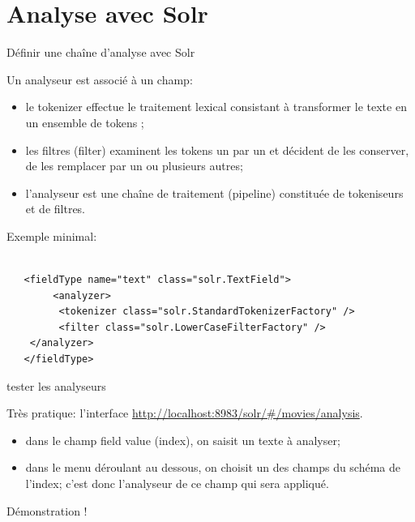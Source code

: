 \section{Analyse avec Solr}

\begin{frame}[fragile]{Définir une chaîne d'analyse avec Solr}

Un analyseur est associé à un champ:

\begin{itemize}
  \item le tokenizer effectue le traitement lexical consistant à transformer le texte en un ensemble de tokens ;
   \item les filtres (filter) examinent les tokens un par un et décident de les conserver, de les remplacer par un ou plusieurs autres;
   \item l’analyseur est une chaîne de traitement (pipeline) constituée de tokeniseurs et de filtres.
\end{itemize}

\vfill
Exemple minimal:

\begin{verbatim}
               
   <fieldType name="text" class="solr.TextField">
		<analyzer>
	   	 <tokenizer class="solr.StandardTokenizerFactory" />
	     <filter class="solr.LowerCaseFilterFactory" />
	</analyzer>
   </fieldType>
\end{verbatim}
  
\end{frame}



\begin{frame}[fragile]{tester les analyseurs}

Très pratique: l'interface \url{http://localhost:8983/solr/#/movies/analysis}.

\vfill

\begin{itemize}
  \item      dans le champ field value (index), on saisit un texte à analyser;
   \item dans le menu déroulant au dessous, on choisit un 
     des champs du schéma de l’index; c’est donc l’analyseur de ce champ 
     qui sera appliqué.
\end{itemize}

\vfill

Démonstration !



\end{frame}

